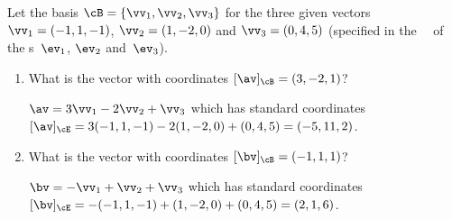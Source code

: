 \begin{example} \label{eg:}
Let the basis \(\cB=\{\vv_1,\vv_2,\vv_3\}\) for the three given vectors \(\vv_1=(-1,1,-1)\), \(\vv_2=(1,-2,0)\) and \(\vv_3=(0,4,5)\) (specified in the ~\cE\ of the s~\(\ev_1\), \(\ev_2\) and~\(\ev_3\)).
\begin{enumerate}
\item What is the vector with coordinates \([\av]_\cB=(3,-2,1)\)?
\begin{solution} 
\(\av=3\vv_1-2\vv_2+\vv_3\) which has standard coordinates 
\([\av]_\cE=3(-1,1,-1)-2(1,-2,0)+(0,4,5)=(-5,11,2)\).
\end{solution}

\item What is the vector with coordinates \([\bv]_\cB=(-1,1,1)\)?
\begin{solution} 
\(\bv=-\vv_1+\vv_2+\vv_3\) which has standard coordinates 
\([\bv]_\cE=-(-1,1,-1)+(1,-2,0)+(0,4,5)=(2,1,6)\).
\end{solution}


\end{enumerate}
\end{example}
